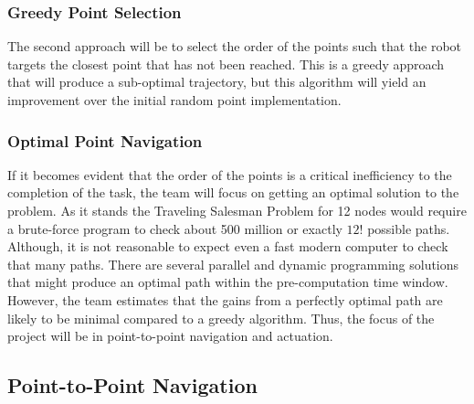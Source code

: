 \documentclass[12pt,conference,onecolumn]{IEEEtran} %
\begin{document}
\subsubsection{Greedy Point Selection}
The second approach will be to select the order of the points such that the robot targets the closest point that has not been reached. This is a greedy approach that will produce a sub-optimal trajectory, but this algorithm will yield an improvement over the initial random point implementation.
\subsubsection{Optimal Point Navigation}
If it becomes evident that the order of the points is a critical inefficiency to the completion of the task, the team will focus on getting an optimal solution to the problem. As it stands the Traveling Salesman Problem for 12 nodes would require a brute-force program to check about 500 million or exactly $12!$ possible paths. Although, it is not reasonable to expect even a fast modern computer to check that many paths. There are several parallel and dynamic programming solutions that might produce an optimal path within the pre-computation time window. However, the team estimates that the gains from a perfectly optimal path are likely to be minimal compared to a greedy algorithm. Thus, the focus of the project will be in point-to-point navigation and actuation.


\subsection{Point-to-Point Navigation}
\end{document}
